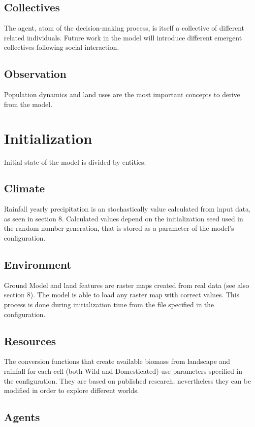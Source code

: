 \subsection{Collectives}
The agent, atom of the decision-making process, is itself a collective of different related individuals.
Future work in the model will introduce different emergent collectives following social interaction.
\subsection{Observation}
Population dynamics and land uses are the most important concepts to derive from the model.

\section{Initialization}
Initial state of the model is divided by entities:

\subsection{Climate}
Rainfall yearly precipitation is an stochastically value calculated from input data, as seen in section 8.
Calculated values depend on the initialization seed used in the random number generation, that is
stored as a parameter of the model's configuration.

\subsection{Environment}
Ground Model and land features are raster maps created from real data (see also section 8). The
model is able to load any raster map with correct values. This process is done during initialization time
from the file specified in the configuration.

\subsection{Resources}
The conversion functions that create available biomass from landscape and rainfall for each cell (both
Wild and Domesticated) use parameters specified in the configuration. They are based on published
research; nevertheless they can be modified in order to explore different worlds.

\subsection{Agents}

